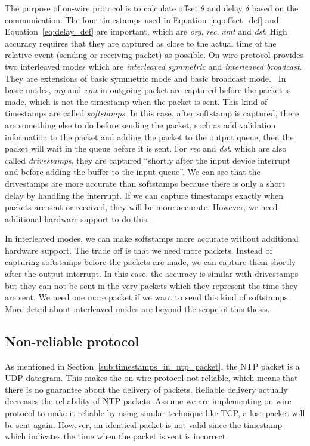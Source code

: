 The purpose of on-wire protocol is to calculate offset $\theta$ and delay
$\delta$ based on the communication. The four timestamps used in
Equation~\ref{eq:offset_def} and Equation~\ref{eq:delay_def} are important,
which are \emph{org}, \emph{rec}, \emph{xmt} and \emph{dst}.
High accuracy requires that they are captured as close to the actual time of
the relative event (sending or receiving packet) as possible. On-wire protocol
provides two interleaved modes which are \emph{interleaved symmetric} and
\emph{interleaved broadcast}. They are extensions of basic symmetric mode and
basic broadcast mode.~\cite{on_wire} 
%
In basic modes, \emph{org} and \emph{xmt} in outgoing packet are captured
before the packet is made, which is not the timestamp when the packet is sent. 
This kind of timestamps are called \emph{softstamps}. In this case, 
after softstamp is captured, there are something else to do before sending the
packet, such as add validation information to the packet and adding the packet
to the output queue, then the packet will wait in the queue before it is sent.
For \emph{rec} and \emph{dst}, which are also called \emph{drivestamps}, they
are captured ``shortly after the input device interrupt and before adding the
buffer to the input queue''\cite{on_wire}. We can see that the drivestamps are
more accurate than softstamps because there is only a short delay by handling
the interrupt. If we can capture timestamps exactly when packets are sent or
received, they will be more accurate. However, we need additional hardware
support to do this.

In interleaved modes, we can make softstamps more accurate without
additional hardware support. The trade off is that we need more packets.
Instead of capturing softstamps before the packets are made, we can capture
them shortly after the output interrupt. In this case, the accuracy is similar
with drivestamps but they can not be sent in the very packets which they
represent the time they are sent. We need one more packet if we want to send
this kind of softstamps. More detail about interleaved modes are beyond the
scope of this thesis.

\subsection{Non-reliable protocol}%
\label{sub:non_reliable_protocol}
As mentioned in Section~\ref{sub:timestamps_in_ntp_packet}, the NTP packet is a
UDP datagram. This makes the on-wire protocol not reliable, which means that
there is no guarantee about the delivery of packets. Reliable delivery actually
decreases the reliability of NTP packets. Assume we are implementing on-wire
protocol to make it reliable by using similar technique like TCP, a lost packet
will be sent again. However, an identical packet is not valid since the
timestamp which indicates the time when the packet is sent is incorrect.

